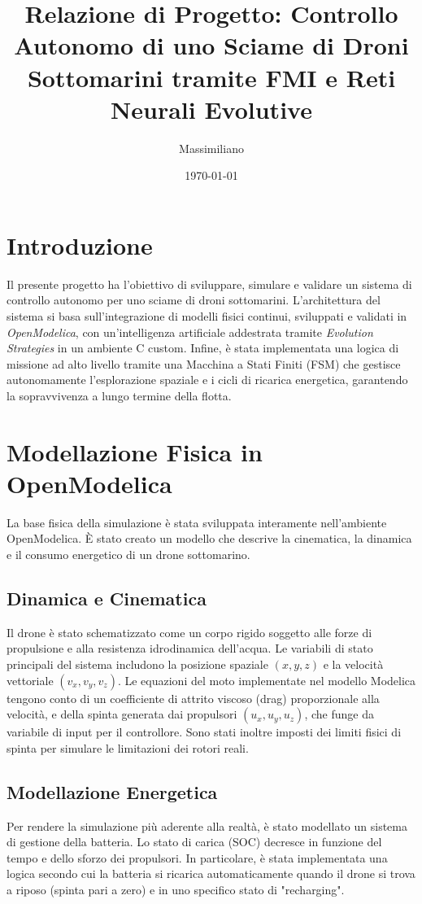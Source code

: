 ﻿\documentclass[12pt,a4paper]{article}
\title{\textbf{Relazione di Progetto: Controllo Autonomo di uno Sciame di Droni Sottomarini tramite FMI e Reti Neurali Evolutive}}
\author{Massimiliano}
\date{\today}
\begin{document}
\maketitle

\tableofcontents
\newpage

\section{Introduzione}
Il presente progetto ha l'obiettivo di sviluppare, simulare e validare un sistema di controllo autonomo per uno sciame di droni sottomarini. L'architettura del sistema si basa sull'integrazione di modelli fisici continui, sviluppati e validati in \textit{OpenModelica}, con un'intelligenza artificiale addestrata tramite \textit{Evolution Strategies} in un ambiente C custom. Infine, è stata implementata una logica di missione ad alto livello tramite una Macchina a Stati Finiti (FSM) che gestisce autonomamente l'esplorazione spaziale e i cicli di ricarica energetica, garantendo la sopravvivenza a lungo termine della flotta.

\section{Modellazione Fisica in OpenModelica}
La base fisica della simulazione è stata sviluppata interamente nell'ambiente OpenModelica. È stato creato un modello che descrive la cinematica, la dinamica e il consumo energetico di un drone sottomarino.

\subsection{Dinamica e Cinematica}
Il drone è stato schematizzato come un corpo rigido soggetto alle forze di propulsione e alla resistenza idrodinamica dell'acqua. Le variabili di stato principali del sistema includono la posizione spaziale $(x, y, z)$ e la velocità vettoriale $(v_x, v_y, v_z)$. 
Le equazioni del moto implementate nel modello Modelica tengono conto di un coefficiente di attrito viscoso (drag) proporzionale alla velocità, e della spinta generata dai propulsori $(u_x, u_y, u_z)$, che funge da variabile di input per il controllore. Sono stati inoltre imposti dei limiti fisici di spinta per simulare le limitazioni dei rotori reali.

\subsection{Modellazione Energetica}
Per rendere la simulazione più aderente alla realtà, è stato modellato un sistema di gestione della batteria. Lo stato di carica (SOC) decresce in funzione del tempo e dello sforzo dei propulsori. In particolare, è stata implementata una logica secondo cui la batteria si ricarica automaticamente quando il drone si trova a riposo (spinta pari a zero) e in uno specifico stato di "recharging".
\end{document}

